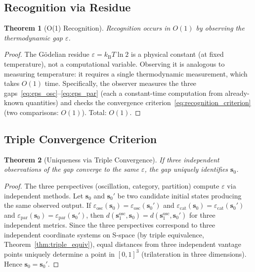 \documentclass[11pt,twocolumn,a4paper]{article}
\newtheorem{theorem}{Theorem}[section]
\theoremstyle{definition}
\newcommand{\kB}{k_{\mathrm{B}}}
\newcommand{\eps}{\varepsilon}
\begin{document}
\subsection{Recognition via Residue}\label{sec:godelian:recognition}

\begin{theorem}[O(1) Recognition]\label{thm:o1_recognition}
Recognition occurs in $O(1)$ by observing the thermodynamic gap $\eps$.
\end{theorem}

\begin{proof}
The G\"odelian residue $\eps = \kB T \ln 2$ is a physical constant (at fixed temperature),
not a computational variable. Observing it is analogous to measuring temperature: it
requires a single thermodynamic measurement, which takes $O(1)$ time. Specifically, the
observer measures the three gaps~\eqref{eq:eps_osc}--\eqref{eq:eps_par} (each a
constant-time computation from already-known quantities) and checks the convergence
criterion~\eqref{eq:recognition_criterion} (two comparisons: $O(1)$). Total: $O(1)$.
\end{proof}

\subsection{Triple Convergence Criterion}\label{sec:godelian:triple}

\begin{theorem}[Uniqueness via Triple Convergence]\label{thm:triple_unique}
If three independent observations of the gap converge to the same $\eps$, the gap
uniquely identifies $\mathbf{s}_0$.
\end{theorem}

\begin{proof}
The three perspectives (oscillation, category, partition) compute $\eps$ via independent
methods. Let $\mathbf{s}_0$ and $\mathbf{s}_0'$ be two candidate initial states producing
the same observed output. If $\eps_{\mathrm{osc}}(\mathbf{s}_0) =
\eps_{\mathrm{osc}}(\mathbf{s}_0')$ and $\eps_{\mathrm{cat}}(\mathbf{s}_0) =
\eps_{\mathrm{cat}}(\mathbf{s}_0')$ and $\eps_{\mathrm{par}}(\mathbf{s}_0) =
\eps_{\mathrm{par}}(\mathbf{s}_0')$, then $d(\mathbf{s}_1^{\mathrm{osc}}, \mathbf{s}_0) =
d(\mathbf{s}_1^{\mathrm{osc}}, \mathbf{s}_0')$ for three independent metrics. Since the
three perspectives correspond to three independent coordinate systems on S-space (by
triple equivalence, Theorem~\ref{thm:triple_equiv}), equal distances from three
independent vantage points uniquely determine a point in $[0,1]^3$ (trilateration in
three dimensions). Hence $\mathbf{s}_0 = \mathbf{s}_0'$.
\end{proof}
\end{document}
